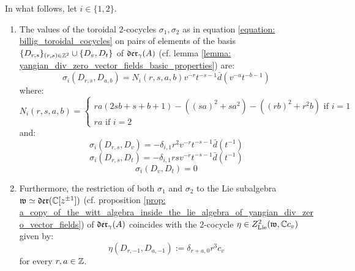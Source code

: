         \begin{lemma} \label{lemma: billig_toroidal_cocycles_on_yangian_div_zero_vector_fields}
            In what follows, let $i \in \{1, 2\}$.
            \begin{enumerate}
                \item The values of the toroidal $2$-cocycles $\sigma_1, \sigma_2$ as in equation \eqref{equation: billig_toroidal_cocycles} on pairs of elements of the basis $\{D_{r, s}\}_{(r, s) \in \mathbb{Z}^2} \cup \{D_v, D_t\}$ of $\mathfrak{der}_{\gamma}(A)$ (cf. lemma \ref{lemma: yangian_div_zero_vector_fields_basic_properties}) are:
                $$\sigma_i(D_{r, s}, D_{a, b}) = N_i(r, s, a, b) v^{-r} t^{-s - 1} \bar{d}( v^{-a} t^{-b - 1} )$$
                where:
                    \begin{equation} \label{equation: billig_cocycles_coefficient}
                        N_i(r, s, a, b) =
                        \begin{cases}
                            \text{$ra(2sb + s + b + 1) - ( (sa)^2 + s a^2 ) - ( (rb)^2 + r^2 b )$ if $i = 1$}
                            \\
                            \text{$ra$ if $i = 2$}
                        \end{cases}
                    \end{equation}
                and:
                    $$\sigma_i(D_{r, s}, D_v) = -\delta_{i, 1} r^2 v^{-r} t^{-s - 1} \bar{d}(t^{-1})$$
                    $$\sigma_i(D_{r, s}, D_t) = -\delta_{i, 1} rs v^{-r} t^{-s - 1} \bar{d}(t^{-1})$$
                    $$\sigma_i(D_v, D_t) = 0$$
                \item Furthermore, the restriction of both $\sigma_1$ and $\sigma_2$ to the Lie subalgebra $\mathfrak{w} \simeq \mathfrak{der}(\mathbb{C}[z^{\pm 1}])$ (cf. proposition \ref{prop: a_copy_of_the_witt_algebra_inside_the_lie_algebra_of_yangian_div_zero_vector_fields}) of $\mathfrak{der}_{\gamma}(A)$ coincides with the $2$-cocycle $\eta \in Z^2_{\mathrm{Lie}}(\mathfrak{w}, \mathbb{C} c_v)$ given by:
                    $$\eta(D_{r, -1}, D_{a, -1}) := \delta_{r + a, 0} r^3 c_v$$
                for every $r, a \in \mathbb{Z}$.
            \end{enumerate}
        \end{lemma}
